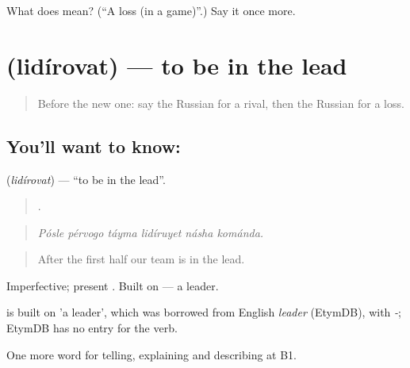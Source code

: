 \begin{tcolorbox}[breakable,colback=teal!4,colframe=teal!35!black,title={Before you move on}]
What does  mean? (\textquotedblleft{}A loss (in a game)\textquotedblright{}.) Say it once more.
\end{tcolorbox}
\section[\texorpdfstring{\ru{лидировать} (lidírovat)}{лидировать (lidírovat)}]{ (lidírovat) — to be in the lead}

\label{lesson:RU-C510-lidirovat}



\begin{quote}
Before the new one: say the Russian for a rival, then the Russian for a loss.
\end{quote}

\subsection*{You'll want to know: }
\textbf{} (\emph{lidírovat}) — \textquotedblleft{}to be in the lead\textquotedblright{}.

\begin{quote}
     .
\end{quote}

\begin{quote}
\emph{Pósle pérvogo táyma lidíruyet násha kománda.}
\end{quote}

\begin{quote}
After the first half our team is in the lead.
\end{quote}

Imperfective; present . Built on \emph{} — a leader.

\begin{cousinweb}
\emph{} is built on \emph{} 'a leader', which was borrowed from English \emph{leader} (EtymDB), with \emph{-}; EtymDB has no entry for the verb.
\end{cousinweb}

\begin{grammarlens}[title={What you've built}]
One more word for telling, explaining and describing at B1.
\end{grammarlens}

